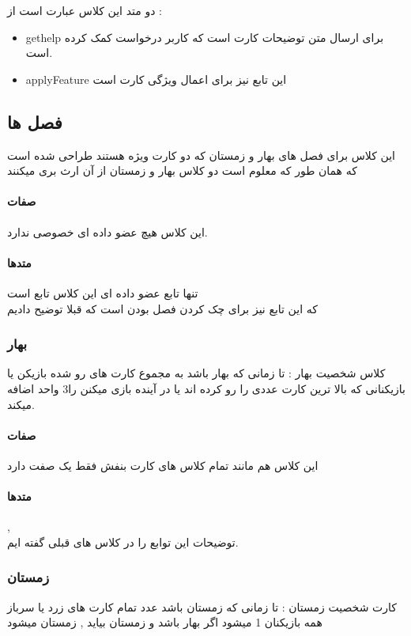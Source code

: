 \documentclass[pdf,titlepage,a4paper]{report}
\begin{document}
	 دو متد این کلاس عبارت است از : \\
	 \begin{latin}
		\begin{itemize}
			\item gethelp  برای ارسال متن توضیحات کارت است که کاربر درخواست کمک کرده است.
			\item applyFeature این تابع نیز برای اعمال ویژگی کارت است
		\end{itemize}
	\end{latin}

	\subsection{فصل ها}
    این کلاس برای فصل های بهار و زمستان که دو کارت ویژه هستند طراحی شده است که همان طور که معلوم است دو کلاس بهار و زمستان از آن ارث بری میکنند

	\paragraph{صفات}
	این کلاس هیچ عضو داده ای خصوصی ندارد.
	\paragraph{متدها}
	تنها تابع عضو داده ای این کلاس تابع  است \\ 
	که این تابع نیز برای چک کردن فصل بودن است که قبلا توضیح دادیم
	
	\subsubsection{بهار}
	 کلاس شخصیت بهار : تا زمانی که بهار باشد به مجموع کارت های رو شده بازیکن یا بازیکنانی که بالا ترین کارت عددی را رو کرده اند یا  در آینده بازی میکنن را3 واحد اضافه میکند.

	\paragraph{صفات}
	این کلاس هم مانند تمام کلاس های کارت بنفش فقط یک صفت  دارد
	\paragraph{متدها}
	 ,  \\
	توضیحات این توابع را در کلاس های قبلی گفته ایم.

	\subsubsection{زمستان}
	کارت شخصیت زمستان : تا زمانی که زمستان باشد عدد تمام کارت های زرد یا سرباز همه بازیکنان 1 میشود اگر بهار باشد و زمستان بیاید , زمستان میشود
\end{document}

